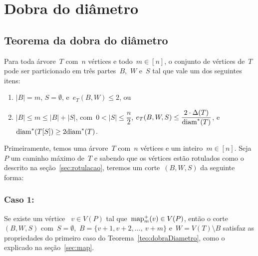 \section {Dobra do diâmetro}
\label{sec:dobraDiametro}
	\subsection{Teorema da dobra do diâmetro}
	
		\begin{teo}
		\label{teo:dobraDiametro}
			Para toda árvore~$T$ com~$n$ vértices e 
			todo~$m\in [n]$,
			o conjunto de vértices de~$T$ pode ser particionado em 
			três partes~$B$,~$W$ e~$S$ tal que vale um dos 
			seguintes itens:
			\begin{enumerate}
				\item ${|B|=m}$, ${S=\emptyset}$, e~${e_T(B,W)\le 2}$, ou
				\item ${|B|\le m\le |B|+|S|}$, 
				com~${0<|S|\le\dfrac{n}{2}}$,
				${e_T(B,W,S)\le \dfrac{2\cdot 
				\Delta(T)}{\mathrm{diam}^*(T)}}$, 
				e~${\mathrm{diam}^*(T[S])\ge 2\mathrm{diam}^*(T)}$.
			\end{enumerate}
		\end{teo}

	\bigskip
	\bigskip



		Primeiramente, temos uma árvore~$T$ com~${n}$ vértices e um 
		inteiro~${m\in[n]}$.
		Seja~$P$ um caminho máximo de~$T$ e sabendo que os vértices
		estão rotulados como o descrito na seção~\ref{sec:rotulacao},
		teremos um corte~$(B,W,S)$ da seguinte forma:
		\bigskip
		\bigskip
	
	\subsubsection*{Caso 1:}
			Se existe um vértice ~${v\in V(P)}$ tal 
			que~${\mathrm{map}_m^+(v)\in V(P)}$, então o 
			corte~$(B,W,S)$ 
			com~${S=\emptyset}$,~${B =\{v+1, v+2,\ldots,~v+m\}}$
			e~${W=V(T)\setminus B}$ satisfaz as propriedades do
			primeiro caso do Teorema~\ref{teo:dobraDiametro},
			como o explicado na seção~\ref{sec:map}.

